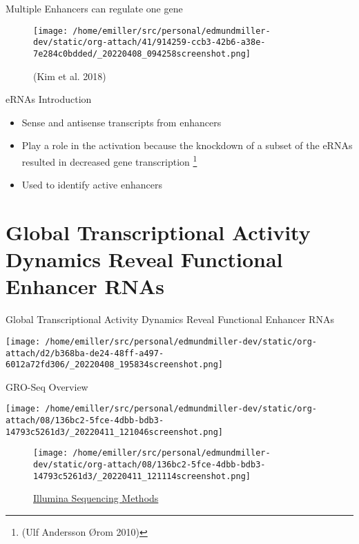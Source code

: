 \documentclass[bigger]{beamer}
\begin{document}
\begin{frame}[label={sec:orgae6d45f}]{Multiple Enhancers can regulate one gene}
\begin{figure}[htbp]
\centering
\texttt{[image: /home/emiller/src/personal/edmundmiller-dev/static/org-attach/41/914259-ccb3-42b6-a38e-7e284c0bdded/\_20220408\_094258screenshot.png]}
\caption[Short caption]{(Kim et al. 2018)}
\end{figure}
\end{frame}


\begin{frame}[label={sec:orgc7fde44}]{eRNAs Introduction}
\begin{itemize}
\item Sense and antisense transcripts from enhancers
\item Play a role in the activation because the knockdown of a subset of the eRNAs
resulted in decreased gene transcription \footnote{(Ulf Andersson Ørom 2010)}
\item Used to identify active enhancers
\end{itemize}
\end{frame}

\section*{Global Transcriptional Activity Dynamics Reveal Functional Enhancer RNAs}
\label{sec:org7007425}
\begin{frame}[label={sec:org992b822}]{Global Transcriptional Activity Dynamics Reveal Functional Enhancer RNAs}
\begin{center}
\texttt{[image: /home/emiller/src/personal/edmundmiller-dev/static/org-attach/d2/b368ba-de24-48ff-a497-6012a72fd306/\_20220408\_195834screenshot.png]}
\end{center}
\end{frame}

\begin{frame}[label={sec:org5af570a}]{GRO-Seq Overview}
\begin{center}
\texttt{[image: /home/emiller/src/personal/edmundmiller-dev/static/org-attach/08/136bc2-5fce-4dbb-bdb3-14793c5261d3/\_20220411\_121046screenshot.png]}
\end{center}

\begin{figure}[htbp]
\centering
\texttt{[image: /home/emiller/src/personal/edmundmiller-dev/static/org-attach/08/136bc2-5fce-4dbb-bdb3-14793c5261d3/\_20220411\_121114screenshot.png]}
\caption{\href{https://www.illumina.com/science/sequencing-method-explorer/kits-and-arrays/5--gro-seq.html}{Illumina Sequencing Methods}}
\end{figure}
\end{frame}
\end{document}
